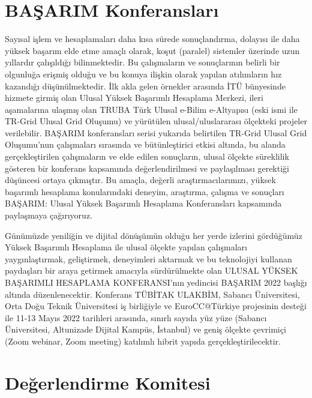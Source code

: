 \section{BAŞARIM Konferansları}

Sayısal işlem ve hesaplamaları daha kısa sürede sonuçlandırma, dolayısı ile daha yüksek başarım elde etme amaçlı olarak, koşut (paralel) sistemler üzerinde uzun yıllardır çalışıldığı bilinmektedir.
Bu çalışmaların ve sonuçlarının belirli bir olgunluğa erişmiş olduğu ve bu konuya ilişkin olarak yapılan atılımların hız kazandığı düşünülmektedir.
İlk akla gelen örnekler arasında İTÜ bünyesinde hizmete girmiş olan Ulusal Yüksek Başarımlı Hesaplama Merkezi,
ileri aşamalarına ulaşmış olan TRUBA Türk Ulusal e-Bilim e-Altyapısı (eski ismi ile TR-Grid Ulusal Grid Oluşumu) ve yürütülen ulusal/uluslararası ölçekteki projeler verilebilir.
BAŞARIM konferansları serisi yukarıda belirtilen TR-Grid Ulusal Grid Oluşumu'nun çalışmaları sırasında ve bütünleştirici etkisi altında, bu alanda gerçekleştirilen çalışmaların ve elde edilen sonuçların, ulusal ölçekte süreklilik gösteren bir konferans kapsamında değerlendirilmesi ve paylaşılması gerektiği düşüncesi ortaya çıkmıştır. Bu amaçla, değerli araştırmacılarımızı, yüksek başarımlı hesaplama konularındaki deneyim, araştırma, çalışma ve sonuçları BAŞARIM: Ulusal Yüksek Başarımlı Hesaplama Konferansları kapsamında paylaşmaya çağırıyoruz.

Günümüzde yeniliğin ve dijital dönüşümün olduğu her yerde izlerini gördüğümüz Yüksek Başarımlı Hesaplama ile ulusal ölçekte yapılan çalışmaları yaygınlaştırmak, geliştirmek, deneyimleri aktarmak ve bu teknolojiyi kullanan paydaşları bir araya getirmek amacıyla sürdürülmekte olan ULUSAL YÜKSEK BAŞARIMLI HESAPLAMA KONFERANSI’nın yedincisi BAŞARIM 2022 başlığı altında düzenlenecektir. Konferans TÜBİTAK ULAKBİM, Sabancı Üniversitesi, Orta Doğu Teknik Üniversitesi iş birliğiyle ve EuroCC@Türkiye projesinin desteği ile 11-13 Mayıs 2022 tarihleri arasında,  sınırlı sayıda yüz yüze  (Sabancı Üniversitesi, Altunizade Dijital Kampüs, İstanbul) ve geniş ölçekte çevrimiçi (Zoom webinar, Zoom meeting) katılımlı hibrit yapıda gerçekleştirilecektir. 

\newpage
\section{Değerlendirme Komitesi}

